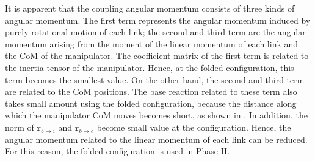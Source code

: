 %
It is apparent that the coupling angular momentum consists of three kinds of angular momentum.
The first term represents the angular momentum induced by
purely rotational motion of each link;
the second and third term are the angular momentum arising from the moment of the linear momentum
of each link and the CoM of the manipulator.
The coefficient matrix of the first term is related to the inertia tensor of the manipulator.
Hence, at the folded configuration,
this term becomes the smallest value.
On the other hand,
the second and third term are related to the CoM positions.
The base reaction related to these term also takes small amount
using the folded configuration,
because the distance along which the manipulator CoM moves becomes short,
as shown in .
In addition,
the norm of $\bm{r}_{b \rightarrow i}$ and $\bm{r}_{b \rightarrow c}$ become small value at the configuration.
Hence, the angular momentum related to the linear momentum of each link can be reduced.
For this reason, the folded configuration is used in Phase II.




